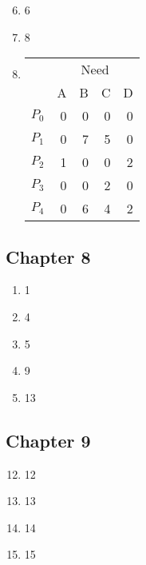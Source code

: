 \documentclass{article}
\begin{document}
\begin{enumerate}
\setcounter{enumi}{5}
\item 6
\setcounter{enumi}{7}
\item 8
\setcounter{enumi}{10}
\item
  \begin{tabular}{l r r r r }
    & \multicolumn{4}{c}{Need}
    \\
    \cline{2-5}
          & A & B & C & D\\
    $P_0$ & 0 & 0 & 0 & 0\\
    $P_1$ & 0 & 7 & 5 & 0\\
    $P_2$ & 1 & 0 & 0 & 2\\
    $P_3$ & 0 & 0 & 2 & 0\\
    $P_4$ & 0 & 6 & 4 & 2
  \end{tabular}
\end{enumerate}

\subsection*{Chapter 8}
\begin{enumerate}
\setcounter{enumi}{0}
\item 1
\setcounter{enumi}{3}
\item 4
\setcounter{enumi}{4}
\item 5
\setcounter{enumi}{8}
\item 9
\setcounter{enumi}{12}
\item 13
\end{enumerate}

\subsection*{Chapter 9}
\begin{enumerate}
\setcounter{enumi}{11}
\item 12
\item 13
\item 14
\item 15
\end{enumerate}
\end{document}
